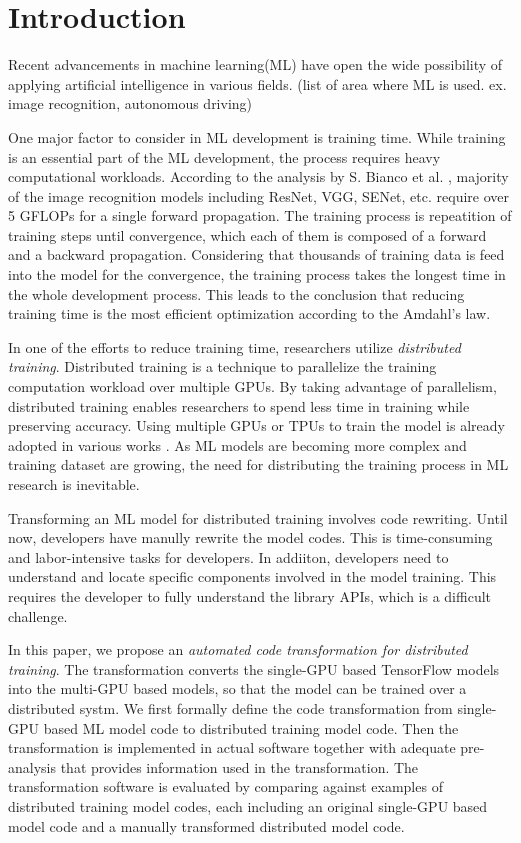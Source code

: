 \section{Introduction}\label{sec:intro}

Recent advancements in machine learning(ML) have open the wide possibility of
applying artificial intelligence in various fields.
(list of area where ML is used. ex. image recognition, autonomous driving)

One major factor to consider in ML development is training time.
While training is an essential part of the ML development,
the process requires heavy computational workloads.
According to the analysis by S. Bianco et al. \cite{bianco2018benchmark},
majority of the image recognition models including ResNet, VGG, SENet, etc.
require over 5 GFLOPs for a single forward propagation.
The training process is repeatition of training steps until convergence,
which each of them is composed of a forward and a backward propagation.
Considering that thousands of training data is feed into the model
for the convergence, the training process takes the longest time
in the whole development process. This leads to the conclusion that
reducing training time is the most efficient optimization according to
the Amdahl's law.

In one of the efforts to reduce training time, 
researchers utilize \textit{distributed training}.
Distributed training is a technique to parallelize the training computation
workload over multiple GPUs.
By taking advantage of parallelism, distributed training enables researchers
to spend less time in training while preserving accuracy.
Using multiple GPUs or TPUs to train the model is already adopted
in various works \cite{brown2020gpt-3} \cite{silver2017alphazero}
\cite{zhang2019distrspeech} \cite{tian2020distrwebattack}.
As ML models are becoming more complex and training dataset are growing,
the need for distributing the training process in ML research is inevitable.

Transforming an ML model for distributed training involves code rewriting.
Until now, developers have manully rewrite the model codes.
This is time-consuming and labor-intensive tasks for developers.
In addiiton, developers need to understand and locate 
specific components involved in the model training.
This requires the developer to fully understand the library APIs,
which is a difficult challenge.

In this paper, we propose an 
\textit{automated code transformation for distributed training}.
The transformation
converts the single-GPU based TensorFlow models
into the multi-GPU based models, so that the model can be trained
over a distributed systm.
We first formally define the code transformation from
single-GPU based ML model code to distributed training model code.
Then the transformation is implemented in actual software together with
adequate pre-analysis that provides information used in the transformation.
The transformation software is evaluated by comparing against 
examples of distributed training model codes, 
each including an original single-GPU based model code 
and a manually transformed distributed model code.

